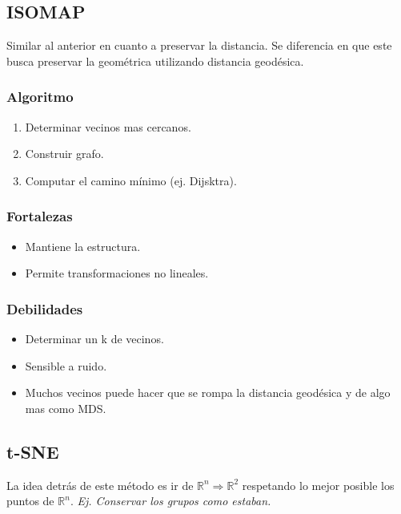 \documentclass[titlepage,a4paper]{article}
\begin{document}
\subsection{ISOMAP}

Similar al anterior en cuanto a preservar la distancia. Se diferencia en que este busca preservar la geométrica utilizando distancia geodésica.

\subsubsection*{Algoritmo}
\begin{enumerate}
    \item Determinar vecinos mas cercanos.
    \item Construir grafo.
    \item Computar el camino mínimo (ej. Dijsktra).
\end{enumerate}

\subsubsection*{Fortalezas}
\begin{itemize}
    \item Mantiene la estructura.
    \item Permite transformaciones no lineales.
\end{itemize}

\subsubsection*{Debilidades}
\begin{itemize}
    \item Determinar un k de vecinos.
    \item Sensible a ruido.
    \item Muchos vecinos puede hacer que se rompa la distancia geodésica y de algo mas como MDS.
\end{itemize}


\subsection{t-SNE}

La idea detrás de este método es ir de $\mathbb{R}^{n} \Rightarrow \mathbb{R}^{2}$ respetando lo mejor posible los puntos de $\mathbb{R}^{n}$. \textit{Ej. Conservar los grupos como estaban.}
\end{document}
